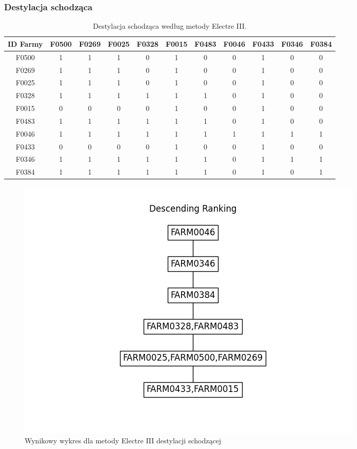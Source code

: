 \documentclass[11pt]{article}
\begin{document}
\subsubsection{Destylacja schodząca}
\begin{table}[H]
\centering
\begin{tabular}{|c||c|c|c|c|c|c|c|c|c|c|}
\hline
\textbf{ID Farmy} & \textbf{F0500} & \textbf{F0269} & \textbf{F0025} & \textbf{F0328} & \textbf{F0015} & \textbf{F0483} & \textbf{F0046} & \textbf{F0433} & \textbf{F0346} & \textbf{F0384} \\
\hline
F0500 & 1 & 1 & 1 & 0 & 1 & 0 & 0 & 1 & 0 & 0 \\
\hline
F0269 & 1 & 1 & 1 & 0 & 1 & 0 & 0 & 1 & 0 & 0 \\
\hline
F0025 & 1 & 1 & 1 & 0 & 1 & 0 & 0 & 1 & 0 & 0 \\
\hline
F0328 & 1 & 1 & 1 & 1 & 1 & 1 & 0 & 1 & 0 & 0 \\
\hline
F0015 & 0 & 0 & 0 & 0 & 1 & 0 & 0 & 1 & 0 & 0 \\
\hline
F0483 & 1 & 1 & 1 & 1 & 1 & 1 & 0 & 1 & 0 & 0 \\
\hline
F0046 & 1 & 1 & 1 & 1 & 1 & 1 & 1 & 1 & 1 & 1 \\
\hline
F0433 & 0 & 0 & 0 & 0 & 1 & 0 & 0 & 1 & 0 & 0 \\
\hline
F0346 & 1 & 1 & 1 & 1 & 1 & 1 & 0 & 1 & 1 & 1 \\
\hline
F0384 & 1 & 1 & 1 & 1 & 1 & 1 & 0 & 1 & 0 & 1 \\
\hline
\end{tabular}
\caption{Destylacja schodząca według metody Electre III.}
\end{table}

\begin{figure}[H]
	\centering
	\includegraphics[scale=0.75]{output/Descending Ranking.png}
	\caption{Wynikowy wykres dla metody Electre III destylacji schodzącej}
\end{figure}
\end{document}

